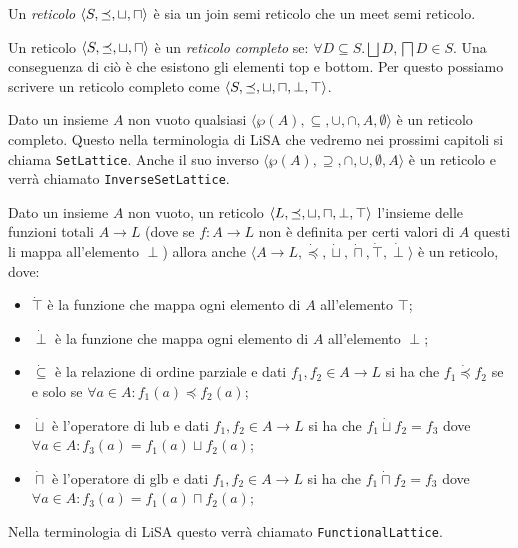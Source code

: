 \begin{definition}[Reticolo]
Un \textit{reticolo} \(\langle S, \preceq,\sqcup, \sqcap\rangle\) è sia un join semi reticolo che un meet semi reticolo.
\end{definition}

\begin{definition}
Un reticolo \(\langle S, \preceq,\sqcup, \sqcap\rangle\) è un \textit{reticolo completo} se: \(\forall D\subseteq S.\bigsqcup D,\bigsqcap D\in S\). Una conseguenza di ciò è che esistono gli elementi top e bottom. Per questo possiamo scrivere un reticolo completo come \(\langle S, \preceq,\sqcup, \sqcap, \perp, \top\rangle\).
\end{definition}

\begin{example}\label{ex:setLattice}
Dato un insieme \(A\) non vuoto qualsiasi \(\langle\wp(A), \subseteq, \cup, \cap, A, \emptyset\rangle\) è un reticolo completo. Questo nella terminologia di LiSA che vedremo nei prossimi capitoli si chiama \texttt{SetLattice}. Anche il suo inverso \(\langle\wp(A), \supseteq, \cap, \cup, \emptyset, A\rangle\) è un reticolo e verrà chiamato \texttt{InverseSetLattice}.
\end{example}

\begin{example}\label{ex:functionalLattice}
Dato un insieme \(A\) non vuoto, un reticolo \(\langle L, \preceq,\sqcup, \sqcap, \perp, \top\rangle\) l'insieme delle funzioni totali \(A\rightarrow L\) (dove se \(f:A\rightarrow L\) non è definita per certi valori di \(A\) questi li mappa all'elemento \(\perp\))  allora anche \(\langle A\rightarrow L, \dot{\preceq}, \dot{\sqcup}, \dot{\sqcap}, \dot{\top}, \dot{\perp}\rangle\) è un reticolo, dove:
\begin{itemize}
    \item \(\dot{\top}\) è la funzione che mappa ogni elemento di \(A\) all'elemento \(\top\); 
    \item \(\dot{\perp}\) è la funzione che mappa ogni elemento di \(A\) all'elemento \(\perp\); 
    \item \(\dot{\subseteq}\) è la relazione di ordine parziale e dati \(f_1, f_2\in A\rightarrow L\) si ha che \(f_1\dot{\preceq} f_2\) se e solo se \(\forall a\in A: f_1(a) \preceq f_2(a)\);
    \item\(\dot{\sqcup}\) è l'operatore di lub e dati \(f_1, f_2\in A\rightarrow L\) si ha che \(f_1\dot{\sqcup}f_2=f_3\) dove \(\forall a\in A: f_3(a)=f_1(a)\sqcup f_2(a)\); 
    \item\(\dot{\sqcap}\) è l'operatore di glb e dati \(f_1, f_2\in A\rightarrow L\) si ha che \(f_1\dot{\sqcap}f_2=f_3\) dove \(\forall a\in A: f_3(a)=f_1(a)\sqcap f_2(a)\); 
\end{itemize}
Nella terminologia di LiSA questo verrà chiamato \texttt{FunctionalLattice}.
\end{example}

